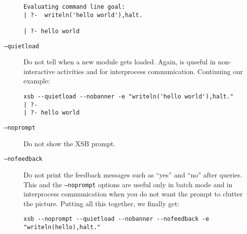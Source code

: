 \begin{description}
\begin{verbatim}
Evaluating command line goal:  
| ?-  writeln('hello world'),halt.

| ?- hello world
\end{verbatim}
%
  \item[{\tt --quietload}] Do not tell when a new module gets
    loaded. Again, is quseful in non-interactive activities and for
    interprocess communication.  Continuing our example:
\begin{verbatim}
xsb --quietload --nobanner -e "writeln('hello world'),halt."
| ?- 
| ?- hello world
\end{verbatim}
%
  \item[{\tt --noprompt}] Do not show the XSB prompt.
%
\item[{\tt --nofeedback}] Do not print the feedback messages such as
  ``yes'' and ``no'' after queries.
    This and the \texttt{--noprompt} options are useful only in batch
    mode and in interprocess communication when you do not want the prompt
    to clutter the picture.  Putting all this together, we finally get: 
\begin{verbatim}
xsb --noprompt --quietload --nobanner --nofeedback -e "writeln(hello),halt."


\end{verbatim}
\end{description}
